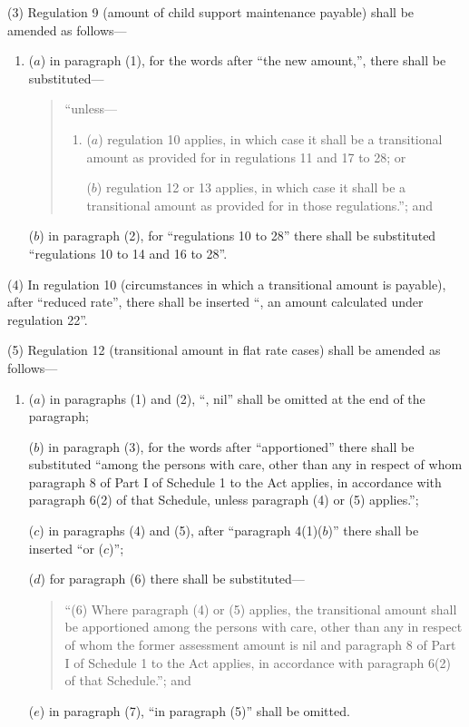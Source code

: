 \documentclass[12pt,a4paper]{article}
\begin{document}
(3) Regulation 9 (amount of child support maintenance payable) shall be amended as follows—
\begin{enumerate}\item[]
($a$) in paragraph (1), for the words after “the new amount,”, there shall be substituted—
\begin{quotation}
    “unless—
\begin{enumerate}\item[]
    ($a$) 
    regulation 10 applies, in which case it shall be a transitional amount as provided for in regulations 11 and 17 to 28; or

    ($b$) 
    regulation 12 or 13 applies, in which case it shall be a transitional amount as provided for in those regulations.”; and 
\end{enumerate}
\end{quotation}

($b$) in paragraph (2), for “regulations 10 to 28” there shall be substituted “regulations 10 to 14 and 16 to 28”.
\end{enumerate}

(4) In regulation 10 (circumstances in which a transitional amount is payable), after “reduced rate”, there shall be inserted “, an amount calculated under regulation 22”.

(5) Regulation 12 (transitional amount in flat rate cases) shall be amended as follows—
\begin{enumerate}\item[]
($a$) in paragraphs (1) and (2), “, nil” shall be omitted at the end of the paragraph;

($b$) in paragraph (3), for the words after “apportioned” there shall be substituted “among the persons with care, other than any in respect of whom paragraph 8 of Part I of Schedule 1 to the Act applies, in accordance with paragraph 6(2) of that Schedule, unless paragraph (4) or (5) applies.”;

($c$) in paragraphs (4) and (5), after “paragraph 4(1)($b$)” there shall be inserted “or ($c$)”;

($d$) for paragraph (6) there shall be substituted—
\begin{quotation}
“(6) Where paragraph (4) or (5) applies, the transitional amount shall be apportioned among the persons with care, other than any in respect of whom the former assessment amount is nil and paragraph 8 of Part I of Schedule 1 to the Act applies, in accordance with paragraph 6(2) of that Schedule.”; and
\end{quotation}

($e$) in paragraph (7), “in paragraph (5)” shall be omitted.
\end{enumerate}
\end{document}
